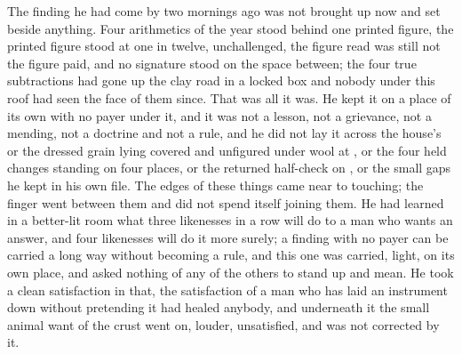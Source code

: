 The finding he had come by two mornings ago was not brought up now and set beside anything. Four arithmetics of the year stood behind one printed figure, the printed figure stood at one in twelve, unchallenged, the figure read was still not the figure paid, and no signature stood on the space between; the four true subtractions had gone up the clay road in a locked box and nobody under this roof had seen the face of them since. That was all it was. He kept it on a place of its own with no payer under it, and it was not a lesson, not a grievance, not a mending, not a doctrine and not a rule, and he did not lay it across the house's  or the dressed grain lying covered and unfigured under wool at , or the four held changes standing on four places, or the returned half-check on , or the small gaps he kept in his own file. The edges of these things came near to touching; the finger went between them and did not spend itself joining them. He had learned in a better-lit room what three likenesses in a row will do to a man who wants an answer, and four likenesses will do it more surely; a finding with no payer can be carried a long way without becoming a rule, and this one was carried, light, on its own place, and asked nothing of any of the others to stand up and mean. He took a clean satisfaction in that, the satisfaction of a man who has laid an instrument down without pretending it had healed anybody, and underneath it the small animal want of the crust went on, louder, unsatisfied, and was not corrected by it.

